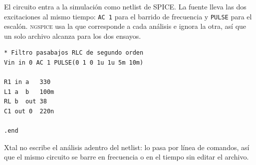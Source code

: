 El circuito entra a la simulación como netlist de SPICE. La fuente lleva las
dos excitaciones al mismo tiempo: \texttt{AC 1} para el barrido de frecuencia y
\texttt{PULSE} para el escalón. \textsc{ngspice} usa la que corresponde a cada
análisis e ignora la otra, así que un solo archivo alcanza para los dos ensayos.

\begin{lstlisting}[language=spice, caption={\texttt{fuentes/filtro-rlc.cir}}, captionpos=b]
* Filtro pasabajos RLC de segundo orden
Vin in 0 AC 1 PULSE(0 1 0 1u 1u 5m 10m)

R1 in a   330
L1 a  b   100m
RL b  out 38
C1 out 0  220n

.end
\end{lstlisting}

\noindent
Xtal no escribe el análisis adentro del netlist: lo pasa por línea de comandos,
así que el mismo circuito se barre en frecuencia o en el tiempo sin editar el
archivo.
